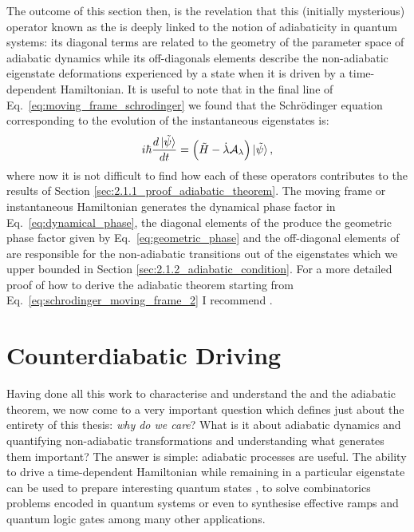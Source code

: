     The outcome of this section then, is the revelation that this (initially mysterious) operator known as the  is deeply linked to the notion of adiabaticity in quantum systems: its diagonal terms are related to the geometry of the parameter space of adiabatic dynamics while its off-diagonals elements describe the non-adiabatic eigenstate deformations experienced by a state when it is driven by a time-dependent Hamiltonian. It is useful to note that in the final line of Eq.~\eqref{eq:moving_frame_schrodinger} we found that the Schr\"{o}dinger equation corresponding to the evolution of the instantaneous eigenstates is:
    \begin{equation}\label{eq:schrodinger_moving_frame_2}
        i \hbar \frac{d \ket*{\Tilde{\psi}}}{dt} = \Big( \Tilde{H} - \dot{\lambda} \mathcal{A}_{\lambda} \Big) \ket*{\Tilde{\psi}},
    \end{equation}
    where now it is not difficult to find how each of these operators contributes to the results of Section \ref{sec:2.1.1_proof_adiabatic_theorem}. The moving frame or instantaneous Hamiltonian generates the dynamical phase factor in Eq.~\eqref{eq:dynamical_phase}, the diagonal elements of the  produce the geometric phase factor given by Eq.~\eqref{eq:geometric_phase} and the off-diagonal elements of  are responsible for the non-adiabatic transitions out of the eigenstates which we upper bounded in Section \ref{sec:2.1.2_adiabatic_condition}. For a more detailed proof of how to derive the adiabatic theorem starting from Eq.~\eqref{eq:schrodinger_moving_frame_2} I recommend \cite{petiziol_accelerated_2020}.
    
    \section{Counterdiabatic Driving}\label{sec:2.3_CD}

    Having done all this work to characterise and understand the  and the adiabatic theorem, we now come to a very important question which defines just about the entirety of this thesis: \emph{why do we care}? What is it about adiabatic dynamics and quantifying non-adiabatic transformations and understanding what generates them important? The answer is simple: adiabatic processes are useful. The ability to drive a time-dependent Hamiltonian while remaining in a particular eigenstate can be used to prepare interesting quantum states \cite{dimitrova_many-body_2023}, to solve combinatorics problems encoded in quantum systems \cite{ebadi_quantum_2022, pichler_quantum_2018} or even to synthesise effective ramps and quantum logic gates \cite{pelegri_high-fidelity_2022} among many other applications. 
    

